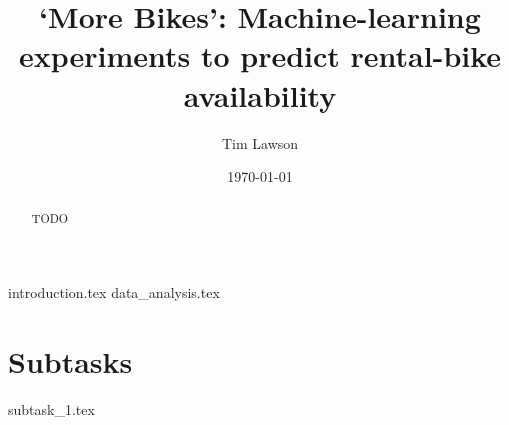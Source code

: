 \documentclass[a4paper,11pt]{extarticle}
\begin{document}
\title{`More Bikes': Machine-learning experiments to predict rental-bike availability}
\author{Tim Lawson}
\date{\today}

\maketitle

\begin{abstract}
  TODO
\end{abstract}

{introduction.tex}
{data_analysis.tex}
\section{Subtasks}
{subtask_1.tex}

\end{document}
